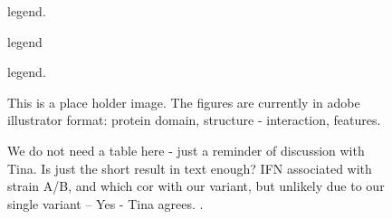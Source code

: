 \documentclass{article}
\begin{document}
\begin{figure}[ht] \hspace*{0cm} %
	\caption{legend.}
	\label{fig:1}
\end{figure}

\begin{figure}[ht] \hspace*{0cm}
	\caption{legend}
	\label{fig:2} \end{figure}

\begin{figure}[ht] \hspace*{0cm}
	\caption{legend.}
	\label{fig:3} \end{figure}
	
	\begin{figure}[ht] \hspace*{0cm}
	\caption{This is a place holder image. The figures are currently in adobe illustrator format: protein domain, structure - interaction, features.}
	\label{fig:4} \end{figure}
	
	\begin{figure}[ht] \hspace*{0cm}
	\caption{We do not need a table here - just a reminder of discussion with Tina.
	Is just the short result in text enough? IFN associated with strain A/B, and which cor with our variant, but unlikely due to our single variant 
	-- Yes - Tina agrees. .}
	\label{fig:5} \end{figure}
\end{document}
